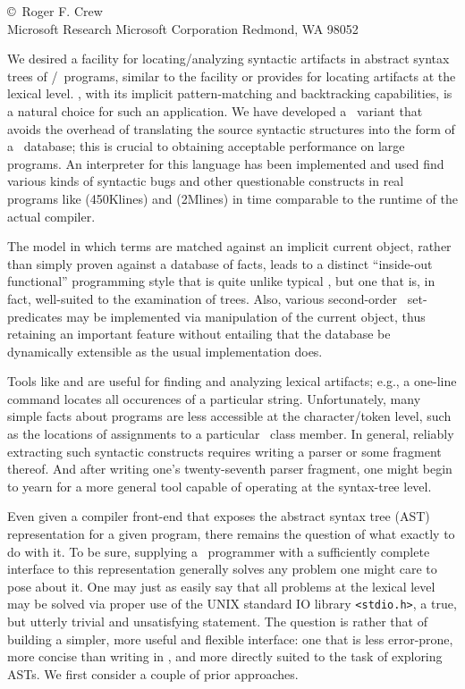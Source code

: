 \secdown
{}
\copyright\ Roger F. Crew \\
Microsoft Research
Microsoft Corporation
Redmond, WA 98052


We desired a facility for locating/analyzing syntactic artifacts in abstract
syntax trees of \ci/\cpp\ programs, similar to the facility  or
 provides for locating artifacts at the lexical level. \prolog, with
its implicit pattern-matching and backtracking capabilities, is a natural choice
for such an application. We have developed a \prolog\ variant that avoids the
overhead of translating the source syntactic structures into the form of a
\prolog\ database; this is crucial to obtaining acceptable performance on large
programs. An interpreter for this language has been implemented and used find
various kinds of syntactic bugs and other questionable constructs in real
programs like  (450Klines) and 
(2Mlines) in time comparable to the runtime of the actual compiler.

The model in which terms are matched against an implicit current object, rather
than simply proven against a database of facts, leads to a distinct ``inside-out
functional'' programming style that is quite unlike typical \prolog, but one
that is, in fact, well-suited to the examination of trees. Also, various second-order
\prolog\ set-predicates may be implemented via manipulation of the current
object, thus retaining an important feature without entailing that the database
be dynamically extensible as the usual implementation does.

\secdown

Tools like  and  are useful for finding and analyzing
lexical artifacts; e.g., a one-line command locates all occurences of a
particular string. Unfortunately, many simple facts about programs are less
accessible at the character/token level, such as the locations of assignments to
a particular \cpp\ class member. In general, reliably extracting such syntactic
constructs requires writing a parser or some fragment thereof. And after writing
one's twenty-seventh parser fragment, one might begin to yearn for a more
general tool capable of operating at the syntax-tree level.

Even given a compiler front-end that exposes the abstract syntax tree (AST)
representation for a given program, there remains the question of what exactly
to do with it. To be sure, supplying a \ci\ programmer with a sufficiently
complete interface to this representation generally solves any problem one might
care to pose about it. One may just as easily say that all problems at the
lexical level may be solved via proper use of the UNIX standard IO library
\verb|<stdio.h>|, a true, but utterly trivial and unsatisfying statement. The
question is rather that of building a simpler, more useful and flexible
interface: one that is less error-prone, more concise than writing in \ci, and
more directly suited to the task of exploring ASTs. We first consider a couple
of prior approaches.

